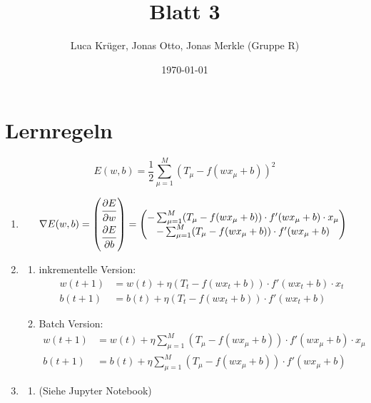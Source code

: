 \documentclass{article}
\title{Blatt 3}
\author{Luca Krüger, Jonas Otto, Jonas Merkle (Gruppe R)}
\date{\today}
\begin{document}
\maketitle

\section{Lernregeln}
$$E(w,b)=\frac{1}{2}\sum_{\mu=1}^{M}(T_{\mu}-f(wx_{\mu}+b))^2$$
\begin{enumerate}
  \item
        \begin{align*}
          \nabla E(w,b)=\begin{pmatrix} \dfrac{\strut \partial E}{\strut \partial w} \\ \dfrac{\strut \partial E}{\strut \partial b}\end{pmatrix} = \begin{pmatrix}
            - \sum_{\mu=1}^{M}(T_{\mu}-f(wx_{\mu}+b)) \cdot f'(wx_{\mu}+b)\cdot x_{\mu} \\
            - \sum_{\mu=1}^{M}(T_{\mu}-f(wx_{\mu}+b)) \cdot f'(wx_{\mu}+b)
          \end{pmatrix} \\
        \end{align*}
  \item
        \begin{enumerate}[label=\alph*)]
          \item inkrementelle Version:
                \begin{align*}
                  w(t+1) & =w(t)+\eta(T_{t}-f(wx_{t}+b)) \cdot f'(wx_{t}+b)\cdot x_t \\
                  b(t+1) & =b(t)+\eta(T_{t}-f(wx_{t}+b)) \cdot f'(wx_{t}+b)
                \end{align*}
          \item Batch Version:
                \begin{align*}
                  w(t+1) & =w(t)+\eta\sum_{\mu=1}^{M}(T_{\mu}-f(wx_{\mu}+b)) \cdot f'(wx_{\mu}+b)\cdot x_{\mu} \\
                  b(t+1) & =b(t)+\eta\sum_{\mu=1}^{M}(T_{\mu}-f(wx_{\mu}+b)) \cdot f'(wx_{\mu}+b)
                \end{align*}
        \end{enumerate}
  \item
        \begin{enumerate}[label=\alph*)]
          \item (Siehe Jupyter Notebook)

\end{enumerate}
\end{enumerate}
\end{document}
